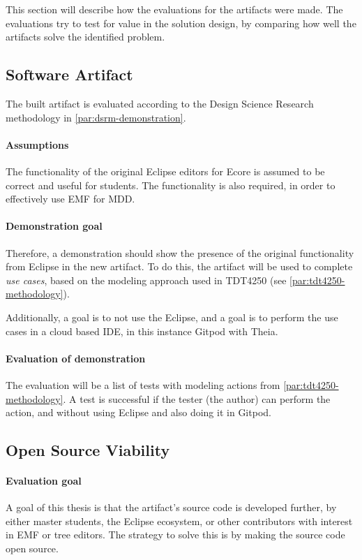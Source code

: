 
This section will describe how the evaluations for the artifacts were made.
The evaluations try to test for value in the solution design, by comparing how well the artifacts solve the identified problem.

\subsection{Software Artifact}

The built artifact is evaluated according to the Design Science Research methodology in \cref{par:dsrm-demonstration}.

\paragraph{Assumptions}
The functionality of the original \gls{Eclipse} editors for \gls{Ecore} is assumed to be correct and useful for students.
The functionality is also required, in order to effectively use \acrshort{EMF} for \acrfull{MDD}.

\paragraph{Demonstration goal}
Therefore, a demonstration should show the presence of the original functionality from \gls{Eclipse} in the new artifact.
To do this, the artifact will be used to complete \textit{use cases}, based on the modeling approach used in \gls{TDT4250} (see \cref{par:tdt4250-methodology}).


Additionally, a goal is to not use the \gls{Eclipse}, and a goal is to perform the use cases in a \gls{cloud} based \gls{IDE}, in this instance \gls{Gitpod} with \gls{Theia}.


\paragraph{Evaluation of demonstration}
The evaluation will be a list of tests with modeling actions from \cref{par:tdt4250-methodology}.
A test is successful if the tester (the author) can perform the action, and without using \gls{Eclipse} and also doing it in \gls{Gitpod}.


\subsection{Open Source Viability}

\paragraph{Evaluation goal}
A goal of this thesis is that the artifact's source code is developed further, by either master students, the Eclipse ecosystem, or other contributors with interest in \acrshort{EMF} or tree editors.
The strategy to solve this is by making the source code \gls{open source}.


